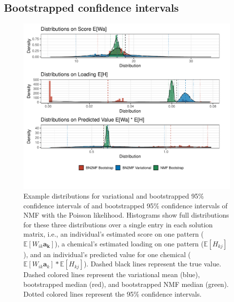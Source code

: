 \subsection{Bootstrapped confidence intervals}
\begin{figure}[!h]
\caption{Example distributions for variational and bootstrapped 95\% confidence intervals of \bnmf and bootstrapped 95\% confidence intervals of NMF with the Poisson likelihood. Histograms show full distributions for these three distributions over a single entry in each solution matrix, i.e., an individual's estimated score on one pattern ($\mathbb{E}[W_{i k}\mathbf{a_k}]$), a chemical's estimated loading on one pattern ($\mathbb{E}[H_{k j}]$), and an individual's predicted value for one chemical ($\mathbb{E}[W_{i k}\mathbf{a}_k]*\mathbb{E}[H_{k j}]$). Dashed black lines represent the true value. Dashed colored lines represent the variational mean (blue), bootstrapped \bnmf median (red), and bootstrapped NMF median (green). Dotted colored lines represent the 95\% confidence intervals.}
\label{fig:ci_dist}
\centering
\includegraphics[scale = 0.65]{./figures/vci_bci_nmfci.pdf}
\end{figure}

